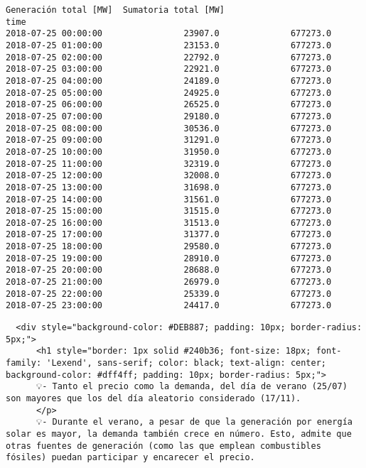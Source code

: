 \documentclass[11pt]{article}
\begin{document}
\begin{tcolorbox}[breakable, size=fbox, boxrule=.5pt, pad at break*=1mm, opacityfill=0]
\begin{Verbatim}[commandchars=\\\{\}]
                     Generación total [MW]  Sumatoria total [MW]
time
2018-07-25 00:00:00                23907.0              677273.0
2018-07-25 01:00:00                23153.0              677273.0
2018-07-25 02:00:00                22792.0              677273.0
2018-07-25 03:00:00                22921.0              677273.0
2018-07-25 04:00:00                24189.0              677273.0
2018-07-25 05:00:00                24925.0              677273.0
2018-07-25 06:00:00                26525.0              677273.0
2018-07-25 07:00:00                29180.0              677273.0
2018-07-25 08:00:00                30536.0              677273.0
2018-07-25 09:00:00                31291.0              677273.0
2018-07-25 10:00:00                31950.0              677273.0
2018-07-25 11:00:00                32319.0              677273.0
2018-07-25 12:00:00                32008.0              677273.0
2018-07-25 13:00:00                31698.0              677273.0
2018-07-25 14:00:00                31561.0              677273.0
2018-07-25 15:00:00                31515.0              677273.0
2018-07-25 16:00:00                31513.0              677273.0
2018-07-25 17:00:00                31377.0              677273.0
2018-07-25 18:00:00                29580.0              677273.0
2018-07-25 19:00:00                28910.0              677273.0
2018-07-25 20:00:00                28688.0              677273.0
2018-07-25 21:00:00                26979.0              677273.0
2018-07-25 22:00:00                25339.0              677273.0
2018-07-25 23:00:00                24417.0              677273.0
\end{Verbatim}
\end{tcolorbox}
        
    \begin{verbatim}
  <div style="background-color: #DEB887; padding: 10px; border-radius: 5px;">
      <h1 style="border: 1px solid #240b36; font-size: 18px; font-family: 'Lexend', sans-serif; color: black; text-align: center; background-color: #dff4ff; padding: 10px; border-radius: 5px;">
      💡- Tanto el precio como la demanda, del día de verano (25/07) son mayores que los del día aleatorio considerado (17/11).
      </p>
      💡- Durante el verano, a pesar de que la generación por energía solar es mayor, la demanda también crece en número. Esto, admite que otras fuentes de generación (como las que emplean combustibles fósiles) puedan participar y encarecer el precio.
\end{verbatim}
\end{document}
